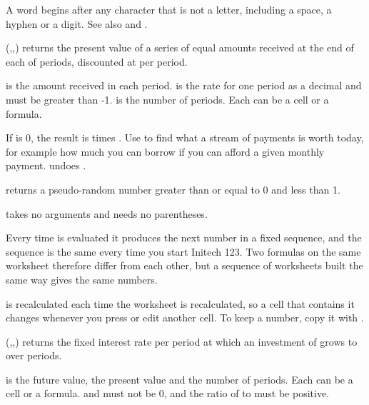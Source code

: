 A word begins after any character that is not a letter, including a space, a hyphen or a digit. See also  and .

\Examples
{}

(,,) returns the present value of a series of equal  amounts received at the end of each of  periods, discounted at  per period.

 is the amount received in each period.  is the rate for one period as a decimal and must be greater than -1.  is the number of periods. Each can be a cell or a formula.

If  is 0, the result is  times . Use  to find what a stream of payments is worth today, for example how much you can borrow if you can afford a given monthly payment.  undoes .

\Examples
{}

 returns a pseudo-random number greater than or equal to 0 and less than 1.

 takes no arguments and needs no parentheses.

Every time  is evaluated it produces the next number in a fixed sequence, and the sequence is the same every time you start Initech 123. Two  formulas on the same worksheet therefore differ from each other, but a sequence of worksheets built the same way gives the same numbers.

\begin{Note}
 is recalculated each time the worksheet is recalculated, so a cell that contains it changes whenever you press  or edit another cell. To keep a number, copy it with .
\end{Note}

\Examples
{}

(,,) returns the fixed interest rate per period at which an investment of  grows to  over  periods.

 is the future value,  the present value and  the number of periods. Each can be a cell or a formula.  and  must not be 0, and the ratio of  to  must be positive.

